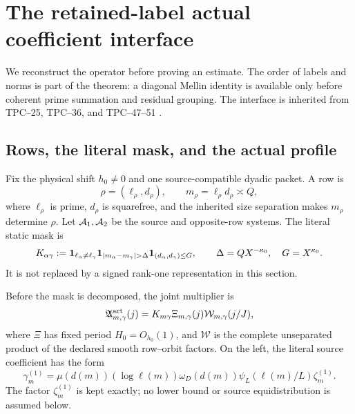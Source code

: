 \section{The retained-label actual coefficient interface}
\label{sec:tpc52-interface}

We reconstruct the operator before proving an estimate.  The order of
labels and norms is part of the theorem: a diagonal Mellin identity is
available only before coherent prime summation and residual grouping.
The interface is inherited from TPC--25, TPC--36, and TPC--47--51
\citep{WangTPC25,WangTPC36,WangTPC47,WangTPC48,WangTPC50,WangTPC51}.

\subsection{Rows, the literal mask, and the actual profile}

Fix the physical shift \(h_0\ne0\) and one source-compatible dyadic
packet.  A row is
\begin{equation}
 \rho=(\ell_\rho,d_\rho),
 \qquad m_\rho=\ell_\rho d_\rho\asymp Q,
 \label{eq:tpc52-row}
\end{equation}
where \(\ell_\rho\) is prime, \(d_\rho\) is squarefree, and the inherited
size separation makes \(m_\rho\) determine \(\rho\).  Let
\(\mathcal A_1,\mathcal A_2\) be the source and opposite-row systems.  The literal
static mask is
\begin{equation}
 K_{\alpha\gamma}
 :=\one_{\ell_\alpha\ne\ell_\gamma}
   \one_{|m_\alpha-m_\gamma|>\Delta}
   \one_{(d_\alpha,d_\gamma)\le G},
 \qquad \Delta=QX^{-\kappa_0},\quad G=X^{\kappa_0}.
 \label{eq:tpc52-literal-mask}
\end{equation}
It is not replaced by a signed rank-one representation in this section.

Before the mask is decomposed, the joint multiplier is
\begin{equation}
 \mathfrak A_{m,\gamma}^{\rm act}(j)
 =K_{m\gamma}\Xi_{m,\gamma}(j)
  \mathcal W_{m,\gamma}(j/J),
 \label{eq:tpc52-joint-multiplier}
\end{equation}
where \(\Xi\) has fixed period \(H_0=O_{h_0}(1)\), and
\(\mathcal W\) is the complete unseparated product of the declared
smooth row--orbit factors.  On the left, the literal source coefficient
has the form
\begin{equation}
 \gamma_m^{(1)}
 =\mu(d(m))(\log\ell(m))
  \omega_D(d(m))\psi_L(\ell(m)/L)\zeta_m^{(1)}.
 \label{eq:tpc52-source-coefficient}
\end{equation}
The factor \(\zeta_m^{(1)}\) is kept exactly; no lower bound or source
equidistribution is assumed below.

